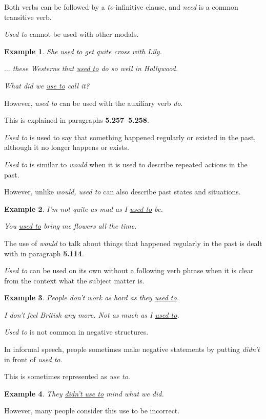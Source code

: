 \documentclass[oneside]{book}
\numberwithin{equation}{section}
\newtheorem{example}{Example}[section]
\begin{document}
Both verbs can be followed by a \textit{to}-infinitive clause, and \textit{need} is a common transitive verb.

%
\noindent{} \textit{Used to} cannot be used with other modals.
\begin{example}
    She \underline{used to} get quite cross with Lily.
    
    $\ldots$ these Westerns that \underline{used to} do so well in Hollywood.
    
    What did we \underline{use to} call it?
\end{example}
However, \textit{used to} can be used with the auxiliary verb \textit{do}.

This is explained in paragraphs \textbf{5.257--5.258}.

%
\noindent{} \textit{Used to} is used to say that something happened regularly or existed in the past, although it no longer happens or exists.

%
\textit{Used to} is similar to \textit{would} when it is used to describe repeated actions in the past.

However, unlike \textit{would, used to} can also describe past states and situations.
\begin{example}
    I'm not quite as mad as I \underline{used to} be.
    
    You \underline{used to} bring me flowers all the time.
\end{example}
The use of \textit{would} to talk about things that happened regularly in the past is dealt with in paragraph \textbf{5.114}.

%
\noindent{} \textit{Used to} can be used on its own without a following verb phrase when it is clear from the context what the subject matter is.
\begin{example}
    People don't work as hard as they \underline{used to}.
    
    I don't feel British any more. Not as much as I \underline{used to}.
\end{example}
%
\noindent{} \textit{Used to} is not common in negative structures.

%
In informal speech, people sometimes make negative statements by putting \textit{didn't} in front of \textit{used to}.

This is sometimes represented as \textit{use to}.
\begin{example}
    They \underline{didn't use to} mind what we did.
\end{example}
However, many people consider this use to be incorrect.
\end{document}
